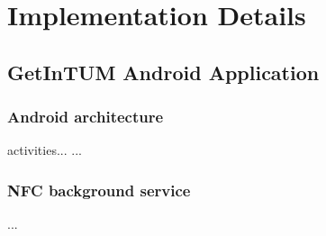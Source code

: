 \section{Implementation Details}\label{sec:impl}

\subsection{GetInTUM Android Application}\label{sec:android}


\subsubsection{Android architecture}
activities...
...

\subsubsection{NFC background service}
...